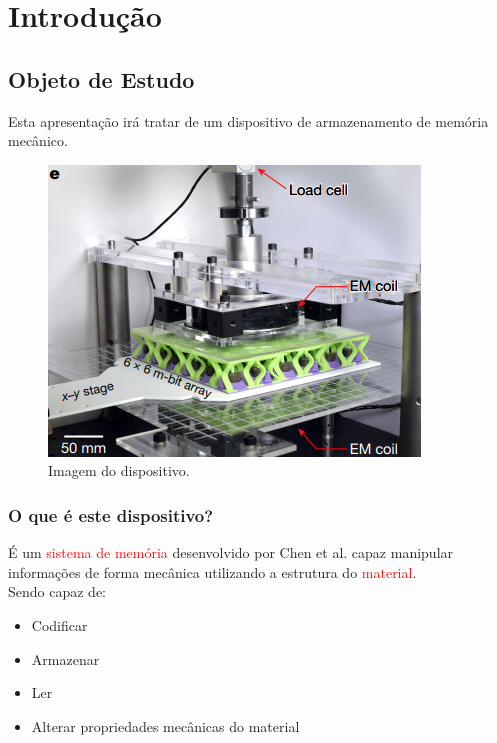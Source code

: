 \section{Introdução}

\subsection{Objeto de Estudo}
Esta apresentação irá tratar de um dispositivo de armazenamento de memória mecânico.

    \begin{figure}[H]
        \centering
        \includegraphics[scale = 0.5]{source/pictures/device.png}
        \caption{Imagem do dispositivo\cite{chen2021reprogrammable}.}
        \label{fig:device}
    \end{figure}

\subsubsection{O que é este dispositivo?}
    É um \textcolor{red}{sistema de memória} desenvolvido por Chen et al. capaz manipular informações de forma mecânica utilizando a estrutura do \textcolor{red}{material}\cite{coulais2021snappy}.\\ 

    Sendo capaz de:

    \begin{itemize}
        \item Codificar
        \item Armazenar
        \item Ler
        \item Alterar propriedades mecânicas do material
    \end{itemize}

